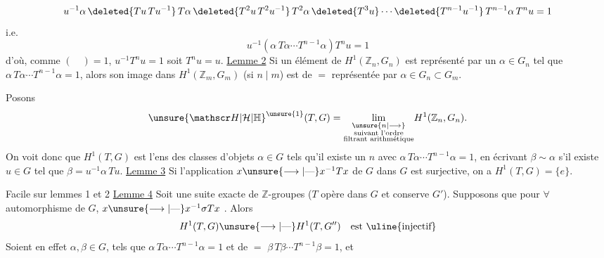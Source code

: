 
\[
u^{-1}\alpha\,\deleted{Tu\,Tu^{-1}}\,T\alpha\,\deleted{T^2u\,T^2u^{-1}}\,T^2\alpha\,\deleted{T^3u}\cdots\deleted{T^{n-1}u^{-1}}\,T^{n-1}\alpha\,T^nu=1
\]
i.e.
\[
u^{-1}(\alpha\,T\alpha\cdots T^{n-1}\alpha)T^nu=1
\]
d'où, comme $(\quad)=1$, $u^{-1}T^nu=1$ soit $T^nu=u$.
\uline{Lemme 2} Si un élément de $H^1(\mathbb Z_n,G_n)$ est représenté par un $\alpha\in G_n$ tel que $\alpha\,T\alpha\cdots T^{n-1}\alpha=1$, alors son image dans $H^1(\mathbb Z_m,G_m)$ (si $n\mid m$) est de $=$ représentée par $\alpha\in G_n\subset G_m$.

Posons
\[
{\unsure{\mathscr H|\mathcal H|\mathbb H}}^{\unsure{1}}(T,G)=\underset{\substack{\unsure{n|\longrightarrow}\\\text{suivant l'ordre}\\\text{filtrant arithmétique}}}{\lim}H^1(\mathbb Z_n,G_n).
\]
On voit donc que $H^1(T,G)$ est l'ens des classes d'objets $\alpha\in G$ tels qu'il existe un $n$ avec $\alpha\,T\alpha\cdots T^{n-1}\alpha=1$,  en écrivant $\beta\sim\alpha$ s'il existe $u\in G$ tel que $\beta=u^{-1}\alpha\,Tu$.
\uline{Lemme 3} Si   l'application $x\unsure{\longrightarrow|\text{---}}x^{-1}Tx$ de $G$ dans $G$ est surjective, on a $H^1(T,G)=\{e\}$.

Facile sur lemmes 1 et 2
\uline{Lemme 4} Soit
une suite exacte de $\mathbb Z$-groupes ($T$ opère dans $G$ et conserve $G'$).
Supposons que pour $\forall$ automorphisme  de $G$,    $x\unsure{\longrightarrow|\text{---}}x^{-1}\sigma Tx$  . Alors
\[
H^1(T,G)\unsure{\longrightarrow|\text{---}}H^1(T,G'')\quad\text{est \uline{injectif}}
\]
Soient en effet $\alpha,\beta\in G$, tels que $\alpha\,T\alpha\cdots T^{n-1}\alpha=1$ et de $=$ $\beta\,T\beta\cdots T^{n-1}\beta=1$, et
